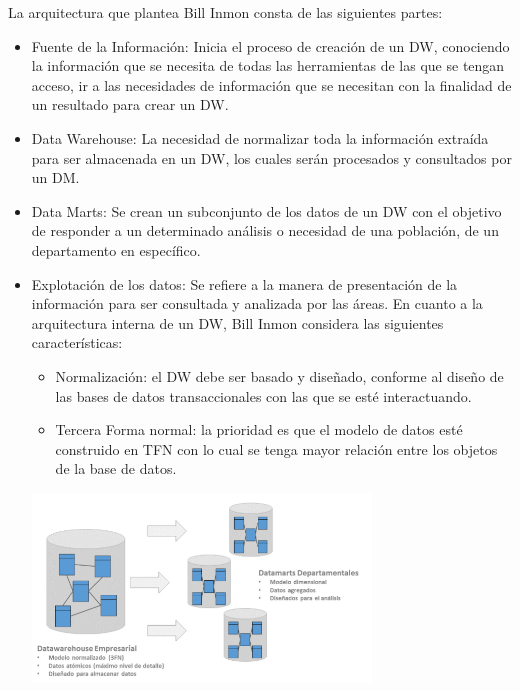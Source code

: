 \documentclass[%
 reprint,
 amsmath,amssymb,
 aps,
]{revtex4-1}
\begin{document}
La arquitectura que plantea Bill Inmon consta de las siguientes partes: \cite{aquino1}
\begin{itemize}
		\item Fuente de la Información: Inicia el proceso de creación de un DW, conociendo la información que se necesita de todas las herramientas de las que se tengan acceso, ir a las necesidades de información que se necesitan con la finalidad de un resultado para crear un DW.

		\item Data Warehouse: La necesidad de normalizar toda la información extraída para ser almacenada en un DW, los cuales serán procesados y consultados por un DM.
		\item Data Marts: Se crean un subconjunto de los datos de un DW con el objetivo de responder a un determinado análisis o necesidad de una población, de un departamento en específico.
		\item Explotación de los datos: Se refiere a la manera de presentación de la información para ser consultada y analizada por las áreas. En cuanto a la arquitectura interna de un DW, Bill Inmon considera las siguientes características:

			\begin{itemize}
				\item Normalización: el DW debe ser basado y diseñado, conforme al diseño de las bases de datos transaccionales con las que se esté interactuando.
				\item Tercera Forma normal: la prioridad es que el modelo de datos esté construido en TFN con lo cual se tenga mayor relación entre los objetos de la base de datos.
			\end{itemize}
			
			
			\begin{center}
					\includegraphics[width=9cm]{./IMAGENES/1}
				\end{center}

\end{itemize}
\end{document}
